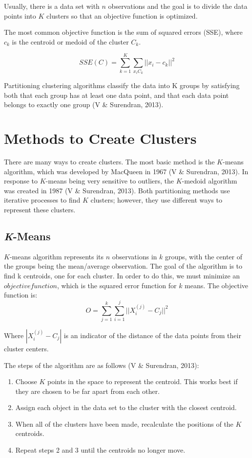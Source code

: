 \documentclass[12pt,twoside]{amherstthesis}
\begin{document}
  Usually, there is a data set with \(n\) observations and the goal is to
  divide the data points into \(K\) clusters so that an objective function
  is optimized.
  
  The most common objective function is the sum of squared errors (SSE),
  where \(c_k\) is the centroid or medoid of the cluster \(C_k\).
  
  \[SSE(C)= \sum_{k=1}^K \sum_{x_{i}C_{k}} ||{x_i}- c_k||^2\]
  
  Partitioning clustering algorithms classify the data into K groups by
  satisfying both that each group has at least one data point, and that
  each data point belongs to exactly one group (V \& Surendran, 2013).
  
  \section{Methods to Create Clusters}\label{methods-to-create-clusters}
  
  There are many ways to create clusters. The most basic method is the
  \(K\)-means algorithm, which was developed by MacQueen in 1967 (V \&
  Surendran, 2013). In response to \(K\)-means being very sensitive to
  outliers, the \(K\)-medoid algorithm was created in 1987 (V \&
  Surendran, 2013). Both partitioning methods use iterative processes to
  find \(K\) clusters; however, they use different ways to represent these
  clusters.
  
  \subsection{\texorpdfstring{\emph{K}-Means}{K-Means}}\label{k-means}
  
  \(K\)-means algorithm represents its \(n\) observations in \(k\) groups,
  with the center of the groups being the mean/average observation. The
  goal of the algorithm is to find k centroids, one for each cluster. In
  order to do this, we must minimize an \(objective function\), which is
  the squared error function for \(k\) means. The objective function is:
  \[O= \sum_{j=1}^k \sum_{i=1}^j ||{{X_i^{(j)}- C_j}}||^2\]
  
  Where \(|{{X_i^{(j)}- C_j}}|\) is an indicator of the distance of the
  data points from their cluster centers.
  
  The steps of the algorithm are as follows (V \& Surendran, 2013):
  
  \begin{enumerate}
  \def\labelenumi{\arabic{enumi}.}
  \item
    Choose \(K\) points in the space to represent the centroid. This works
    best if they are chosen to be far apart from each other.
  \item
    Assign each object in the data set to the cluster with the closest
    centroid.
  \item
    When all of the clusters have been made, recalculate the positions of
    the \(K\) centroids.
  \item
    Repeat steps 2 and 3 until the centroids no longer move.
  \end{enumerate}
  
\end{document}
